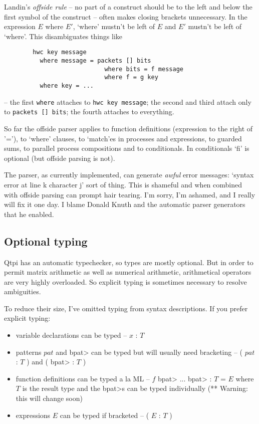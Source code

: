 \documentclass[11pt,a4paper]{article}
\newcommand{\verbtt}[1]{\texttt{\small{}#1}}
\begin{document}
Landin's \emph{offside rule} -- no part of a construct should be to the left and below the first symbol of the construct -- often makes closing brackets unnecessary. In the expression $E$ where $E'$, `where' mustn't be left of $E$ and $E'$ mustn't be left of `where'. This disambiguates things like 

\begin{verbatim}
		hwc key message
		  where message = packets [] bits
		                    where bits = f message
		                    where f = g key
		  where key = ...
\end{verbatim}
	
-- the first \verbtt{where} attaches to \verbtt{hwc key message}; the second and third attach only to \verbtt{packets [] bits}; the fourth attaches to everything.

So far the offside parser applies to function definitions (expression to the right of '='), to `where' clauses, to `match'es in processes and expressions, to guarded sums, to parallel process compositions and to conditionals. In conditionals `fi' is optional (but offside parsing is not).

The parser, as currently implemented, can generate \emph{awful} error messages: `syntax error at line k character j' sort of thing. This is shameful and when combined with offside parsing can prompt hair tearing. I'm sorry, I'm ashamed, and I really will fix it one day. I blame Donald Knuth and the automatic parser generators that he enabled.

\subsection{Optional typing}

Qtpi has an automatic typechecker, so types are mostly optional. But in order to permit matrix arithmetic as well as numerical arithmetic, arithmetical operators are very highly overloaded. So explicit typing is sometimes necessary to resolve ambiguities.

To reduce their size, I've omitted typing from syntax descriptions. If you prefer explicit typing:  

\begin{itemize}
\item variable declarations can be typed -- $x$ : $T$
\item patterns $pat$ and \<bpat> can be typed but will usually need bracketing -- ( $pat$ : $T$ ) and ( \<bpat> : $T$ ) 
\item function definitions can be typed a la ML -- $f$ \<bpat> ... \<bpat> : $T$ = $E$  where $T$ is the result type and the \<bpat>s can be typed individually (** Warning: this will change soon)
\item expressions $E$ can be typed if bracketed -- ( $E$ : $T$ )
\end{itemize}
\end{document}
